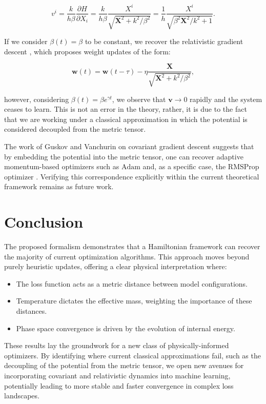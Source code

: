 \documentclass[12pt]{article}
\begin{document}
\begin{equation}
v^{i} = \frac{k}{h\beta} \frac{\partial H}{\partial X_{i}} =  \frac{k}{h\beta}  \frac{X^{i}}{ \sqrt{\mathbf{X}^2 + k^2/\beta^2}} = \frac{1}{h} \frac{X^{i}}{\sqrt{\beta^2\mathbf{X}^2/k^2 + 1}}.
\end{equation}

If we consider $\beta(t) = \beta$ to be constant, we recover the relativistic gradient descent \cite{franca_conformal}, which proposes weight updates of the form:

\begin{equation}
\mathbf{w}(t) = \mathbf{w}(t-\tau) - \eta \frac{\mathbf{X}}{ \sqrt{\mathbf{X}^2 + k^2/\beta^2}},
\end{equation}

however, considering $\beta(t) = \beta e^{\gamma t}$, we observe that $\mathbf{v} \rightarrow 0$ rapidly and the system ceases to learn. This is not an error in the theory, rather, it is due to the fact that we are working under a classical approximation in which the potential is considered decoupled from the metric tensor.

The work of Guskov and Vanchurin on covariant gradient descent \cite{guskov_covariant} suggests that by embedding the potential into the metric tensor, one can recover adaptive momentum-based optimizers such as $\text{Adam}$ \cite{kingma_adam} and, as a specific case, the $\text{RMSProp}$ optimizer \cite{hinton_nn}. Verifying this correspondence explicitly within the current theoretical framework remains as future work.

\section*{Conclusion}

The proposed formalism demonstrates that a Hamiltonian framework can recover the majority of current optimization algorithms. This approach moves beyond purely heuristic updates, offering a clear physical interpretation where:

\begin{itemize}
  \item The loss function acts as a metric distance between model configurations.
  \item Temperature dictates the effective mass, weighting the importance of these distances.
  \item Phase space convergence is driven by the evolution of internal energy.
\end{itemize}
These results lay the groundwork for a new class of physically-informed optimizers. By identifying where current classical approximations fail, such as the decoupling of the potential from the metric tensor, we open new avenues for incorporating covariant and relativistic dynamics into machine learning, potentially leading to more stable and faster convergence in complex loss landscapes.
\newpage
\appendix
\end{document}

